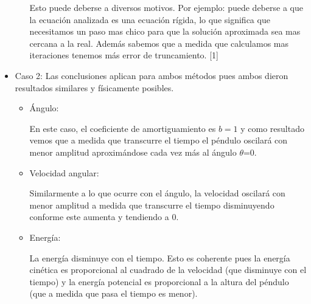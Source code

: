 \documentclass[titlepage,a4paper]{article}
\begin{document}
\begin{itemize}
\begin{itemize}
            Esto puede deberse a diversos motivos.
            Por ejemplo: puede deberse a que la ecuación analizada es una ecuación rígida, lo que significa que necesitamos un paso mas chico para que la solución aproximada sea mas cercana a la real. Además sabemos que a medida que calculamos mas iteraciones tenemos más error de truncamiento. [1]
        \end{itemize}
        
        \item Caso 2:
        Las conclusiones aplican para ambos métodos pues ambos dieron resultados similares y físicamente posibles.
            
        \begin{itemize}
            \item Ángulo:
            
            En este caso, el coeficiente de amortiguamiento es $b = 1$ y como resultado vemos que a medida que transcurre el tiempo el péndulo oscilará con menor amplitud aproximándose cada vez más al ángulo $\theta$=0.
            
            \item Velocidad angular:
            
            Similarmente a lo que ocurre con el ángulo, la velocidad oscilará con menor amplitud a medida que transcurre el tiempo disminuyendo conforme este aumenta y tendiendo a $0$.
            
            \item Energía:
            
            La energía disminuye con el tiempo. Esto es coherente pues la energía cinética es proporcional al cuadrado de la velocidad (que disminuye con el tiempo) y la energía potencial es proporcional a la altura del péndulo (que a medida que pasa el tiempo es menor).
        \end{itemize}
    \end{itemize}

    \newpage
\end{document}
